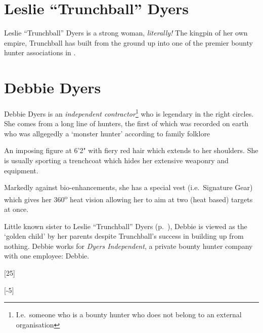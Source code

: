 \section{Leslie ``Trunchball'' Dyers}
\label{sec:lesl-trunchb-dyers}

Leslie ``Trunchball'' Dyers is a strong woman, \emph{literally!} The kingpin of
her own empire, Trunchball has built \thecompany from the ground up into one of
the premier bounty hunter associations in .

\begin{character}
     

\end{character}

\section{Debbie Dyers}
\label{sec:debbie-dyers}

Debbie Dyers is an \emph{independent contractor}\footnote{I.e.~someone who is a
  bounty hunter who does not belong to an external organisation} who is
legendary in the right circles. She comes from a long line of hunters, the first
of which was recorded on earth who was allgegedly a `monster hunter' according
to family folklore

An imposing figure at 6'2" with fiery red hair which extends to her shoulders.
She is usually sporting a trenchcoat which hides her extensive weaponry and
equipment.

Markedly against bio-enhancements, she has a special vest (i.e.~Signature Gear)
which gives her 360\textsuperscript{o} heat vision allowing her to aim at
two (heat based) targets at once.

Little known sister to Leslie ``Trunchball'' Dyers
(p.~\pageref{sec:lesl-trunchb-dyers}), Debbie is viewed as the `golden child' by her
parents despite Trunchball's success in building \thecompany up from nothing.
Debbie works for \emph{Dyers Independent}, a private bounty hunter company with
one employee: Debbie.

\begin{character}
     


  [25]

  [-5]

\end{character}


